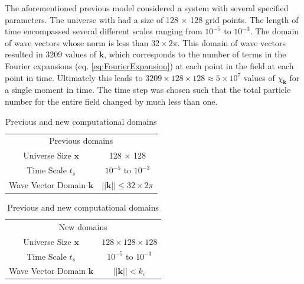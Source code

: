 \documentclass{article}
\begin{document}
                The aforementioned previous model\cite{Jain} considered a system with several specified parameters.  The universe with had a size of 128 $\times$ 128 grid points. The length of time encompassed several different scales ranging from $10^{-5}$ to $10^{-3}$.  The domain of wave vectors whose norm is less than $32 \times 2 \pi$.  This domain of wave vectors resulted in 3209 values of $\mathbf{k}$, which corresponds to the number of terms in the Fourier expansions (eq. \ref{eq:FourierExpansion}) at each point in the field at each point in time.  Ultimately this leads to $3209 \times 128 \times 128 \approx 5 \times 10^7$ values of $\chi_\mathbf{k}$ for a single moment in time.  The time step was chosen such that the total particle number for the entire field changed by much less than one.

                \begin{table}[h]
                    \centering
                    \begin{tabular}{c|c}
                        \multicolumn{2}{c}{Previous domains}  \\
                         Universe Size $\mathbf{x}$      & 128 $\times$ 128 \\
                         \hline
                         Time Scale $t_s$                & $10^{-5}$ to $10^{-3}$ \\
                         \hline
                         Wave Vector Domain $\mathbf{k}$ & $||\mathbf{k}|| \leq 32 \times 2 \pi$ \\
                    \end{tabular}
                    \quad
                    \begin{tabular}{c|c}
                        \multicolumn{2}{c}{New domains}  \\
                         Universe Size $\mathbf{x}$      & $128 \times 128 \times 128$ \\
                         \hline
                         Time Scale $t_s$                & $10^{-5}$ to $10^{-3}$ \\
                         \hline
                         Wave Vector Domain $\mathbf{k}$ & $||\mathbf{k}|| < k_c$ \\
                    \end{tabular}
                    \caption{Previous and new computational domains}
                    \label{tab:Domains}
                \end{table}
\end{document}
